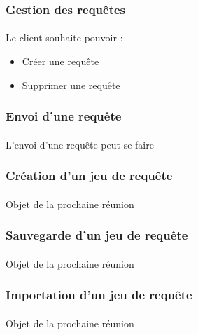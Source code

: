 \documentclass[12pt]{article}
\begin{document}
\subsubsection{Gestion des requêtes}

\paragraph{} Le client souhaite pouvoir :
\begin{itemize}
 \item Créer une requête
 \item Supprimer une requête
\end{itemize}

\subsubsection{Envoi d'une requête}
\paragraph{} L'envoi d'une requête peut se faire

\subsubsection{Création d'un jeu de requête}
\paragraph{} Objet de la prochaine réunion

\subsubsection{Sauvegarde d'un jeu de requête}
\paragraph{} Objet de la prochaine réunion

\subsubsection{Importation d'un jeu de requête}
\paragraph{} Objet de la prochaine réunion


\end{document}
